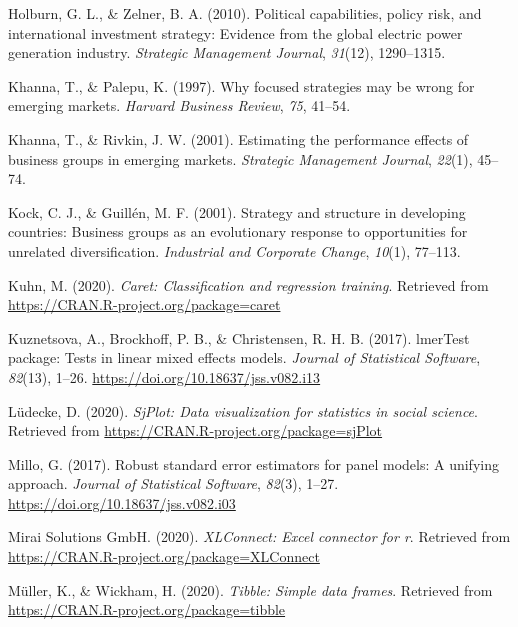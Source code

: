 \documentclass[
  english,
  man]{apa6}
\begin{document}
\leavevmode\hypertarget{ref-holburn2010political}{}%
Holburn, G. L., \& Zelner, B. A. (2010). Political capabilities, policy risk, and international investment strategy: Evidence from the global electric power generation industry. \emph{Strategic Management Journal}, \emph{31}(12), 1290--1315.

\leavevmode\hypertarget{ref-khanna1997focused}{}%
Khanna, T., \& Palepu, K. (1997). Why focused strategies may be wrong for emerging markets. \emph{Harvard Business Review}, \emph{75}, 41--54.

\leavevmode\hypertarget{ref-khanna2001estimating}{}%
Khanna, T., \& Rivkin, J. W. (2001). Estimating the performance effects of business groups in emerging markets. \emph{Strategic Management Journal}, \emph{22}(1), 45--74.

\leavevmode\hypertarget{ref-kock2001strategy}{}%
Kock, C. J., \& Guillén, M. F. (2001). Strategy and structure in developing countries: Business groups as an evolutionary response to opportunities for unrelated diversification. \emph{Industrial and Corporate Change}, \emph{10}(1), 77--113.

\leavevmode\hypertarget{ref-R-caret}{}%
Kuhn, M. (2020). \emph{Caret: Classification and regression training}. Retrieved from \url{https://CRAN.R-project.org/package=caret}

\leavevmode\hypertarget{ref-R-lmerTest}{}%
Kuznetsova, A., Brockhoff, P. B., \& Christensen, R. H. B. (2017). lmerTest package: Tests in linear mixed effects models. \emph{Journal of Statistical Software}, \emph{82}(13), 1--26. \url{https://doi.org/10.18637/jss.v082.i13}

\leavevmode\hypertarget{ref-R-sjPlot}{}%
Lüdecke, D. (2020). \emph{SjPlot: Data visualization for statistics in social science}. Retrieved from \url{https://CRAN.R-project.org/package=sjPlot}

\leavevmode\hypertarget{ref-R-plm_b}{}%
Millo, G. (2017). Robust standard error estimators for panel models: A unifying approach. \emph{Journal of Statistical Software}, \emph{82}(3), 1--27. \url{https://doi.org/10.18637/jss.v082.i03}

\leavevmode\hypertarget{ref-R-XLConnect}{}%
Mirai Solutions GmbH. (2020). \emph{XLConnect: Excel connector for r}. Retrieved from \url{https://CRAN.R-project.org/package=XLConnect}

\leavevmode\hypertarget{ref-R-tibble}{}%
Müller, K., \& Wickham, H. (2020). \emph{Tibble: Simple data frames}. Retrieved from \url{https://CRAN.R-project.org/package=tibble}
\end{document}
